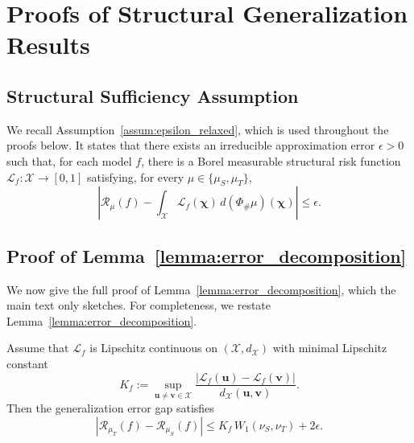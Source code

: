 \section{Proofs of Structural Generalization Results}
\label{app:structural-results}

\subsection{Structural Sufficiency Assumption}
\label{app:structural-sufficiency}

We recall Assumption~\ref{assum:epsilon_relaxed}, which is used throughout the proofs below. It states that there exists an irreducible approximation error $\epsilon>0$ such that, for each model $f$, there is a Borel measurable structural risk function $\mathcal{L}_f:\mathcal{X}\to[0,1]$ satisfying, for every $\mu\in\{\mu_S,\mu_T\}$,
\begin{equation}
\left|
\mathcal{R}_{\mu}(f)
-
\int_{\mathcal{X}}
\mathcal{L}_f(\boldsymbol{\chi})\,d(\Phi_{\#}\mu)(\boldsymbol{\chi})
\right|
\le \epsilon .
\end{equation}

\subsection{Proof of Lemma~\ref{lemma:error_decomposition}}
\label{app:proof-error-decomp}
We now give the full proof of Lemma~\ref{lemma:error_decomposition}, which the main text only sketches. For completeness, we restate Lemma~\ref{lemma:error_decomposition}.

Assume that $\mathcal{L}_f$ is Lipschitz continuous on $(\mathcal{X}, d_{\mathcal{X}})$ with minimal Lipschitz constant
\begin{equation}
K_f
:=
\sup_{\boldsymbol{u}\neq \boldsymbol{v} \in \mathcal{X}}
\frac{|\mathcal{L}_f(\boldsymbol{u})-\mathcal{L}_f(\boldsymbol{v})|}{d_{\mathcal{X}}(\boldsymbol{u},\boldsymbol{v})}.
\end{equation}
Then the generalization error gap satisfies
\begin{equation}
\left|
\mathcal{R}_{\mu_T}(f)-\mathcal{R}_{\mu_S}(f)
\right|
\le
K_f\,W_1(\nu_S,\nu_T)+2\epsilon.
\end{equation}

